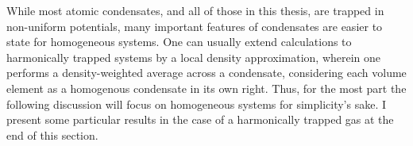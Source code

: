 	While most atomic condensates, and all of those in this thesis, are trapped in non-uniform potentials, many important features of condensates are easier to state for homogeneous systems.
	One can usually extend calculations to harmonically trapped systems by a local density approximation, wherein one performs a density-weighted average across a condensate, considering each volume element as a homogenous condensate in its own right.
	Thus, for the most part the following discussion will focus on homogeneous systems for simplicity's sake.
	I present some particular results in the case of a harmonically trapped gas at the end of this section.




	
	
